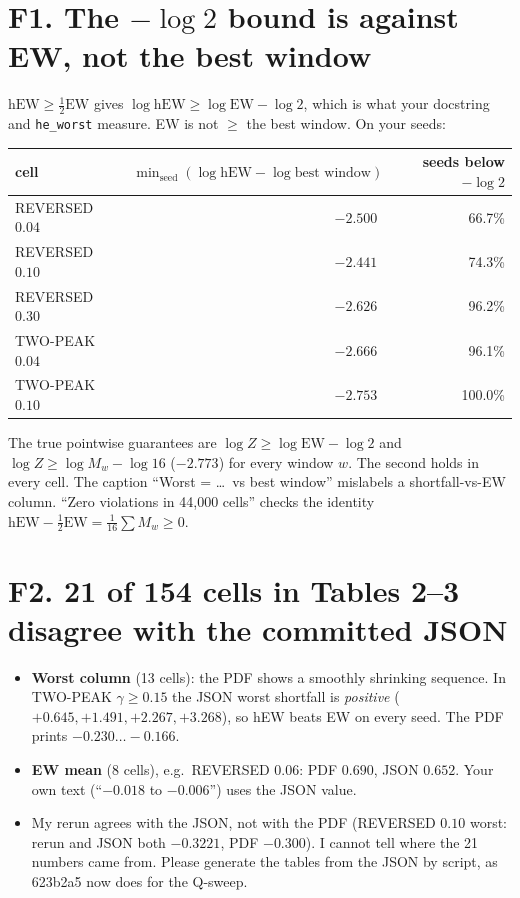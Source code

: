 \documentclass[11pt]{article}
\begin{document}
\section*{F1. The $-\log2$ bound is against EW, not the best window}
$\text{hEW}\ge\frac12\text{EW}$ gives $\log\text{hEW}\ge\log\text{EW}-\log2$, which is what your docstring and \texttt{he\_worst} measure. EW is not $\ge$ the best window. On your seeds:
\begin{center}\small\begin{tabular}{lrr}\toprule
cell & $\min_{\text{seed}}(\log\text{hEW}-\log\text{best window})$ & seeds below $-\log2$\\\midrule
REVERSED $0.04$ & $-2.500$ & 66.7\%\\
REVERSED $0.10$ & $-2.441$ & 74.3\%\\
REVERSED $0.30$ & $-2.626$ & 96.2\%\\
TWO-PEAK $0.04$ & $-2.666$ & 96.1\%\\
TWO-PEAK $0.10$ & $-2.753$ & 100.0\%\\\bottomrule
\end{tabular}\end{center}
The true pointwise guarantees are $\log Z\ge\log\text{EW}-\log2$ and $\log Z\ge\log M_w-\log16$ ($-2.773$) for every window $w$. The second holds in every cell. The caption ``Worst = \dots\ vs best window'' mislabels a shortfall-vs-EW column. ``Zero violations in 44{,}000 cells'' checks the identity $\text{hEW}-\frac12\text{EW}=\frac1{16}\sum M_w\ge0$.

\section*{F2. 21 of 154 cells in Tables 2--3 disagree with the committed JSON}
\begin{itemize}[nosep]
\item \textbf{Worst column} (13 cells): the PDF shows a smoothly shrinking sequence. In TWO-PEAK $\gamma\ge0.15$ the JSON worst shortfall is \emph{positive} ($+0.645,+1.491,+2.267,+3.268$), so hEW beats EW on every seed. The PDF prints $-0.230\dots-0.166$.
\item \textbf{EW mean} (8 cells), e.g.\ REVERSED $0.06$: PDF $0.690$, JSON $0.652$. Your own text (``$-0.018$ to $-0.006$'') uses the JSON value.
\item My rerun agrees with the JSON, not with the PDF (REVERSED $0.10$ worst: rerun and JSON both $-0.3221$, PDF $-0.300$). I cannot tell where the 21 numbers came from. Please generate the tables from the JSON by script, as 623b2a5 now does for the Q-sweep.
\end{itemize}
\end{document}
